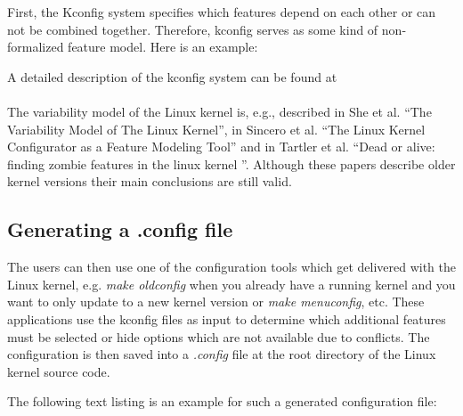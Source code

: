 First, the Kconfig system specifies which features depend on each other or can not be combined together. 
Therefore, kconfig serves as some kind of non-formalized feature model.
Here is an example:


A detailed description of the kconfig system can be found at \cite{Kernel_4} 
\\ \ \\
The variability model of the Linux kernel is, e.g., described in She et al. 
``The Variability Model of The Linux Kernel''\cite{she2010variability},
in Sincero et al. ``The Linux Kernel Configurator as a Feature Modeling Tool''\cite{sincero2008linux}
and in Tartler et al. ``Dead or alive: finding zombie features in the linux kernel
''\cite{tartler2009dead}.
Although these papers describe older kernel versions their main conclusions are still valid.

\subsection{Generating a .config file}

The users can then use one of the configuration tools which get delivered with the Linux kernel,
e.g. {\it make oldconfig} when you already have a running kernel and you want to only 
update to a new kernel version or 
{\it make menuconfig}, etc.
These applications use the kconfig files as input to determine which additional features 
must be selected or hide options which are not available due to conflicts.
The configuration is then saved into a {\it .config} file at the root directory of the 
Linux kernel source code.

The following text listing is an example for such a generated configuration file:

\FloatBarrier

